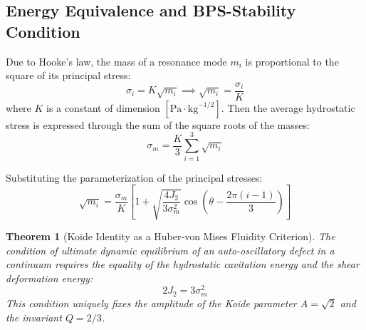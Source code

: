 \documentclass[12pt,a4paper]{article}
\newtheorem{theorem}{Theorem}
\begin{document}
	\subsection{Energy Equivalence and BPS-Stability Condition}
	Due to Hooke's law, the mass of a resonance mode $m_i$ is proportional to the square of its principal stress:
	\begin{equation}
		\sigma_i = K \sqrt{m_i} \implies \sqrt{m_i} = \frac{\sigma_i}{K}
	\end{equation}
	where $K$ is a constant of dimension $[\text{Pa}\cdot\text{kg}^{-1/2}]$.
	Then the average hydrostatic stress is expressed through the sum of the square roots of the masses:
	\begin{equation}
		\sigma_m = \frac{K}{3} \sum_{i=1}^3 \sqrt{m_i}
	\end{equation}
	
	Substituting the parameterization of the principal stresses:
	\begin{equation}
		\sqrt{m_i} = \frac{\sigma_m}{K} \left[ 1 + \sqrt{\frac{4 J_2}{3 \sigma_m^2}} \cos\left( \theta - \frac{2\pi(i-1)}{3} \right) \right]
	\end{equation}
	
	\begin{theorem}[Koide Identity as a Huber-von Mises Fluidity Criterion]
		The condition of ultimate dynamic equilibrium of an auto-oscillatory defect in a continuum requires the equality of the hydrostatic cavitation energy and the shear deformation energy:
		\begin{equation}
			2 J_2 = 3 \sigma_m^2
		\end{equation}
		This condition uniquely fixes the amplitude of the Koide parameter $A = \sqrt{2}$ and the invariant $Q = 2/3$.
	\end{theorem}
	
\end{document}
